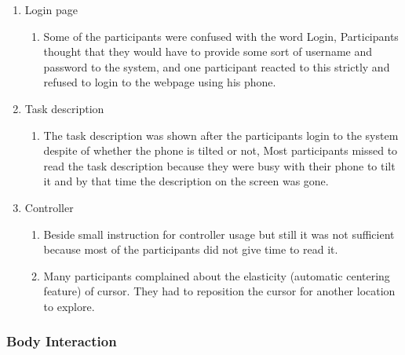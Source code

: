 \begin{enumerate}
\item	Login page
\begin{enumerate}
\item	Some of the participants were confused with the word Login, Participants thought that they would have to provide some sort of username and password to the system, and one participant reacted to this strictly and refused to login to the webpage using his phone.
\end{enumerate}

\item	Task description
\begin{enumerate}
\item	The task description was shown after the participants login to the system despite of whether the phone is tilted or not, Most participants missed to read the task description because they were busy with their phone to tilt it and by that time the description on the screen was gone.
\end{enumerate}

\item	Controller
\begin{enumerate}
\item	Beside small instruction for controller usage but still it was not sufficient because most of the participants did not give time to read it.	
\item	Many participants complained about the elasticity (automatic centering feature) of cursor. They had to reposition the cursor for another location to explore.
\end{enumerate}
\end{enumerate}

\subsubsection {Body Interaction}

